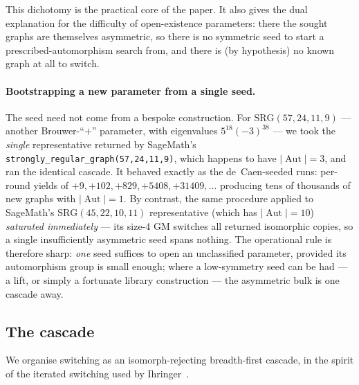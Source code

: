 \documentclass[11pt]{article}
\theoremstyle{definition}
\newcommand{\SRG}[1]{\mathrm{SRG}(#1)}
\newcommand{\Aut}{\operatorname{Aut}}
\begin{document}
This dichotomy is the practical core of the paper. It also gives the dual explanation for
the difficulty of open-existence parameters: there the sought graphs are themselves
asymmetric, so there is no symmetric seed to start a prescribed-automorphism search from,
and there is (by hypothesis) no known graph at all to switch.

\paragraph{Bootstrapping a new parameter from a single seed.} The seed need not come from a
bespoke construction. For $\SRG{57,24,11,9}$ --- another Brouwer-``$+$'' parameter, with
eigenvalues $5^{18}(-3)^{38}$ --- we took the \emph{single} representative returned by
SageMath's \verb|strongly_regular_graph(57,24,11,9)|, which happens to have $|\Aut|=3$, and
ran the identical cascade. It behaved exactly as the de~Caen-seeded runs: per-round yields of
$+9, +102, +829, +5408, +31409, \dots$ producing tens of thousands of new graphs with
$|\Aut|=1$. By contrast, the same procedure applied to SageMath's $\SRG{45,22,10,11}$
representative (which has $|\Aut|=10$) \emph{saturated immediately} --- its size-4 GM switches
all returned isomorphic copies, so a single insufficiently asymmetric seed spans nothing. The
operational rule is therefore sharp: \emph{one} seed suffices to open an unclassified
parameter, provided its automorphism group is small enough; where a low-symmetry seed can be
had --- a lift, or simply a fortunate library construction --- the asymmetric bulk is one
cascade away.

\subsection{The cascade}\label{sec:cascade}

We organise switching as an isomorph-rejecting breadth-first cascade, in the spirit of
the iterated switching used by Ihringer~\cite{ihringer2020}.
\end{document}
